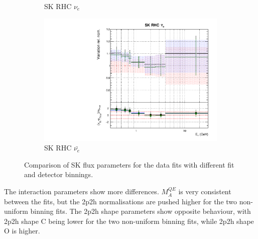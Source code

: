 \begin{figure}[!htbp]
\begin{subfigure}{0.45\textwidth}
  \caption{SK RHC $\nu_{e}$}
\end{subfigure}
\begin{subfigure}{0.45\textwidth}
  \centering
  \includegraphics[width=0.75\linewidth]{figs/polydataflux_15}
  \caption{SK RHC $\bar{\nu_e}$}
\end{subfigure}
\caption{Comparison of SK flux parameters for the data fits with different fit and detector binnings.}
\label{fig:polydatafluxSK}
\end{figure}

The interaction parameters show more differences. $M_A^{QE}$ is very consistent between the fits, but the 2p2h normalisations are pushed higher for the two non-uniform binning fits. The 2p2h shape parameters show opposite behaviour, with 2p2h shape C being lower for the two non-uniform binning fits, while 2p2h shape O is higher.

